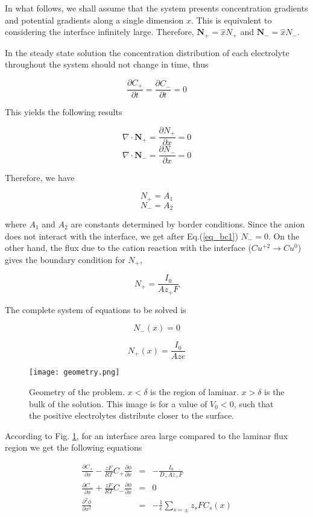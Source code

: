 In what follows, we shall assume that the system presents concentration gradients and
potential gradients along a single dimension $x$. This is equivalent to considering the interface infinitely large. Therefore, $\mathbf{N}_{+} = \hat{x}N_{+}$ and $\mathbf{N}_{-} = \hat{x}N_{-}$. 

In the steady state solution the concentration distribution of each electrolyte throughout the system should not change in time, thus

$$\frac{\partial C_+}{\partial t} = \frac{\partial C_-}{\partial t} = 0$$

This yields the following results

$$\nabla\cdot \mathbf{N}_+ = \frac{\partial N_{+}}{\partial x}=0$$
$$\nabla \cdot \mathbf{N}_- = \frac{\partial N_{-}}{\partial x}=0$$

Therefore, we have

$$N_+ = A_1$$
$$N_- = A_2$$

where $A_1$ and $A_2$ are constants determined by border conditions. Since the anion does not interact with the interface, we get after Eq.(\ref{eq_bc1})
$N_- = 0$. On the other hand, the flux due to the cation reaction with the interface ($Cu^{+2}\rightarrow Cu^{0}$) gives the boundary condition for $N_+$,

$$N_+ = \frac{I_0}{Az_+F}$$

The complete system of equations to be solved is

$$N_-(x) = 0$$

$$N_+(x) = \frac{I_0}{Aze}$$

\begin{figure}[h!]
\centering
	\texttt{[image: geometry.png]}
	\caption{Geometry of the problem. $x<\delta$ is the region of laminar. $x>\delta$ is the bulk of the solution. This image is for a value of $V_0<0$, such that the positive electrolytes distribute closer to the surface.}
\label{fig:geometry}
\end{figure}


According to Fig. \ref{fig:geometry}, for an interface area large compared to the laminar flux region we get the following equations 

\begin{eqnarray}\label{eq:system}
\frac{\partial C_+}{\partial x}-\frac{z F}{RT}C_+\frac{\partial \phi}{\partial x} &=& -\frac{I_0}{D_+Az_+ F}\label{eq:eq1} \\
\frac{\partial C_-}{\partial x}+\frac{z F}{RT}C_-\frac{\partial \phi}{\partial x} &=& 0 \label{eq:eq2}\\
\frac{\partial^2 \phi}{\partial x^2} &=& -\frac{1}{\epsilon} \sum_{s=\pm}z_s F C_s(x)\label{eq:eq3}
\end{eqnarray}

